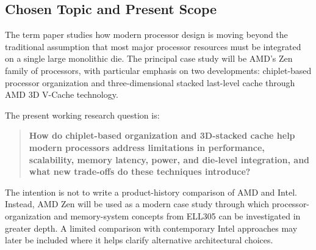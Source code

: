 \subsection{Chosen Topic and Present Scope}
\label{sec:scope}

The term paper studies how modern processor design is moving beyond the traditional assumption that most major processor resources must be integrated on a single large monolithic die. The principal case study will be AMD's Zen family of processors, with particular emphasis on two developments: chiplet-based processor organization and three-dimensional stacked last-level cache through AMD 3D V-Cache technology.

The present working research question is:

\begin{quote}
\textbf{How do chiplet-based organization and 3D-stacked cache help modern processors address limitations in performance, scalability, memory latency, power, and die-level integration, and what new trade-offs do these techniques introduce?}
\end{quote}

The intention is not to write a product-history comparison of AMD and Intel. Instead, AMD Zen will be used as a modern case study through which processor-organization and memory-system concepts from ELL305 can be investigated in greater depth. A limited comparison with contemporary Intel approaches may later be included where it helps clarify alternative architectural choices.
